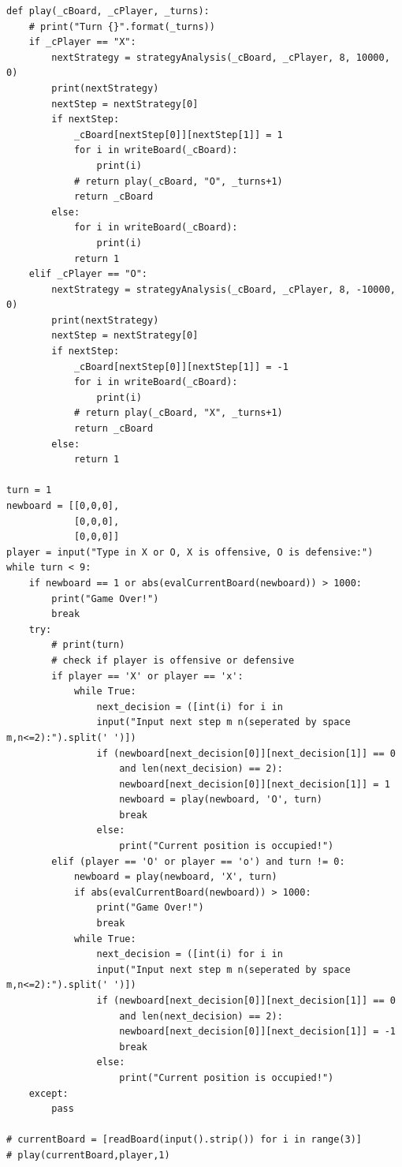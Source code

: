 \documentclass[titlepage]{article}
\begin{document}
\begin{verbatim}
def play(_cBoard, _cPlayer, _turns):
    # print("Turn {}".format(_turns))
    if _cPlayer == "X":
        nextStrategy = strategyAnalysis(_cBoard, _cPlayer, 8, 10000, 0)
        print(nextStrategy)
        nextStep = nextStrategy[0]
        if nextStep:
            _cBoard[nextStep[0]][nextStep[1]] = 1
            for i in writeBoard(_cBoard):
                print(i)
            # return play(_cBoard, "O", _turns+1)
            return _cBoard
        else:
            for i in writeBoard(_cBoard):
                print(i)
            return 1
    elif _cPlayer == "O":
        nextStrategy = strategyAnalysis(_cBoard, _cPlayer, 8, -10000, 0)
        print(nextStrategy)
        nextStep = nextStrategy[0]
        if nextStep:
            _cBoard[nextStep[0]][nextStep[1]] = -1
            for i in writeBoard(_cBoard):
                print(i)
            # return play(_cBoard, "X", _turns+1)
            return _cBoard
        else:
            return 1

turn = 1
newboard = [[0,0,0],
            [0,0,0],
            [0,0,0]]
player = input("Type in X or O, X is offensive, O is defensive:")
while turn < 9:
    if newboard == 1 or abs(evalCurrentBoard(newboard)) > 1000:
        print("Game Over!")
        break
    try:
        # print(turn)
        # check if player is offensive or defensive
        if player == 'X' or player == 'x':
            while True:
                next_decision = ([int(i) for i in 
                input("Input next step m n(seperated by space m,n<=2):").split(' ')])
                if (newboard[next_decision[0]][next_decision[1]] == 0 
                    and len(next_decision) == 2):
                    newboard[next_decision[0]][next_decision[1]] = 1
                    newboard = play(newboard, 'O', turn)
                    break
                else:
                    print("Current position is occupied!")
        elif (player == 'O' or player == 'o') and turn != 0:
            newboard = play(newboard, 'X', turn)
            if abs(evalCurrentBoard(newboard)) > 1000:
                print("Game Over!")
                break
            while True:
                next_decision = ([int(i) for i in 
                input("Input next step m n(seperated by space m,n<=2):").split(' ')])
                if (newboard[next_decision[0]][next_decision[1]] == 0 
                    and len(next_decision) == 2):
                    newboard[next_decision[0]][next_decision[1]] = -1
                    break
                else:
                    print("Current position is occupied!")
    except:
        pass

# currentBoard = [readBoard(input().strip()) for i in range(3)]
# play(currentBoard,player,1)
\end{verbatim}
\end{document}
